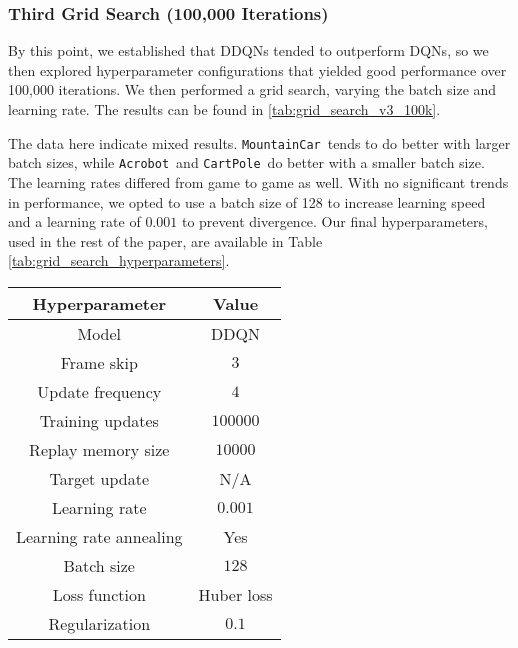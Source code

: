 \documentclass[11pt]{article}
\newcommand{\cp}{\texttt{CartPole}}
\newcommand{\ab}{\texttt{Acrobot}}
\newcommand{\mc}{\texttt{MountainCar}}
\begin{document}
\subsubsection{Third Grid Search (100,000 Iterations)}

By this point, we established that DDQNs tended to outperform DQNs, so we then explored hyperparameter configurations that yielded good performance over 100,000 iterations. We then performed a grid search, varying the batch size and learning rate. The results can be found in \ref{tab:grid_search_v3_100k}.

\begin{table*}[!ht]
    \footnotesize
    \centering
    
    
    \caption{Complete results for our third grid search, sorted by mean reward. All experiments used the DDQN-GS model with a Huber loss function, learning rate annealing, and a $0.1$ weight decay for 100,000 training iterations.}
    \label{tab:grid_search_v3_100k}
\end{table*}

The data here indicate mixed results. \mc~tends to do better with larger batch sizes, while \ab~and \cp~do better with a smaller batch size. The learning rates differed from game to game as well. With no significant trends in performance, we opted to use a batch size of 128 to increase learning speed and a learning rate of $0.001$ to prevent divergence. Our final hyperparameters, used in the rest of the paper, are available in Table \ref{tab:grid_search_hyperparameters}.

\begin{table*}[!ht]
    \footnotesize
    \centering
    \begin{tabular}{c|c}
        \toprule
        Hyperparameter & Value \\ \midrule
        Model & DDQN \\
        Frame skip & $3$ \\
        Update frequency & $4$ \\
        Training updates & $100000$ \\
        Replay memory size & $10000$ \\
        Target update & N/A \\
        Learning rate & $0.001$ \\
        Learning rate annealing & Yes \\
        Batch size & $128$ \\
        Loss function & Huber loss \\
        Regularization & $0.1$ \\
        \bottomrule
    \end{tabular}
    \caption{The hyperparameters found by our grid search and used for the PCA variants of the (D)DQN.}
    \label{tab:grid_search_hyperparameters}
\end{table*}
\end{document}
